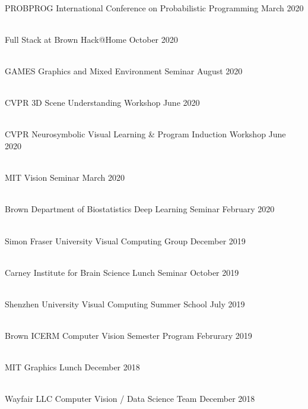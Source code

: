 \documentclass[line,margin]{res}
\begin{document}
\begin{resume}
\\
\talk
	{PROBPROG}
	{International Conference on Probabilistic Programming}
	{March 2020}

\\
\talk
	{Full Stack at Brown}
	{Hack@Home}
	{October 2020}

\\
\talk
	{GAMES}
	{Graphics and Mixed Environment Seminar}
	{August 2020}

\\
\talk
	{CVPR}
	{3D Scene Understanding Workshop}
	{June 2020}

\\
\talk
	{CVPR}
	{Neurosymbolic Visual Learning \& Program Induction Workshop}
	{June 2020}

\\
\talk
	{MIT}
	{Vision Seminar}
	{March 2020}

\\
\talk
	{Brown Department of Biostatistics}
	{Deep Learning Seminar}
	{February 2020}

\\
\talk
	{Simon Fraser University}
	{Visual Computing Group}
	{December 2019}

\\
\talk
	{Carney Institute for Brain Science}
	{Lunch Seminar}
	{October 2019}

\\
\talk
	{Shenzhen University}
	{Visual Computing Summer School}
	{July 2019}

\\
\talk
	{Brown ICERM}
	{Computer Vision Semester Program}
	{Februrary 2019}

\\
\talk
	{MIT}
	{Graphics Lunch}
	{December 2018}

\\
\talk
	{Wayfair LLC}
	{Computer Vision / Data Science Team}
	{December 2018}


\end{resume}
\end{document}
